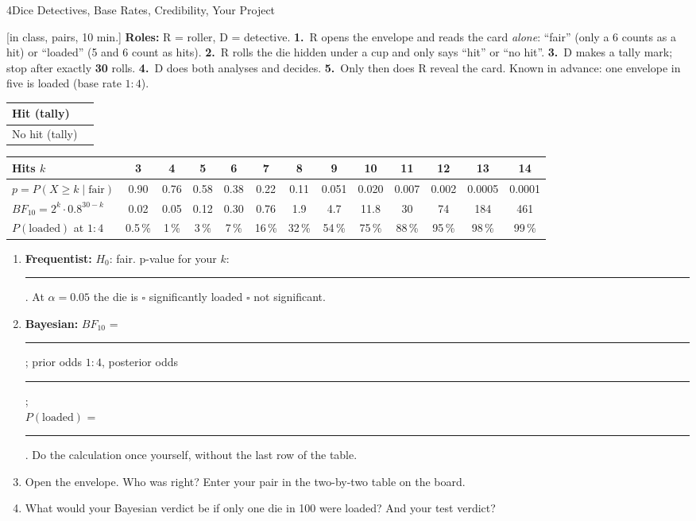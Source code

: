 \begin{uebungsblattb}{4}{Dice Detectives, Base Rates, Credibility, Your Project}

[in class, pairs, 10 min.]
\textbf{Roles:} R = roller, D = detective. \textbf{1.}~R opens the
envelope and reads the card \emph{alone}: \enquote{fair} (only a 6 counts
as a hit) or \enquote{loaded} (5 and 6 count as hits). \textbf{2.}~R rolls
the die hidden under a cup and only says \enquote{hit} or \enquote{no
hit}. \textbf{3.}~D makes a tally mark; stop after exactly \textbf{30}
rolls. \textbf{4.}~D does both analyses and decides. \textbf{5.}~Only then
does R reveal the card. Known in advance: one envelope in five is loaded
(base rate $1:4$).

\begin{center}
\renewcommand{\arraystretch}{1.6}
\begin{tabular}{|p{}|p{}|}
\hline
Hit (tally) & \\ \hline
No hit (tally) & \\ \hline
\end{tabular}
\end{center}

\begin{center}
\footnotesize
\setlength{\tabcolsep}{3.5pt}
\begin{tabular}{@{}l*{12}{c}@{}}
\toprule
Hits $k$ & 3 & 4 & 5 & 6 & 7 & 8 & 9 & 10 & 11 & 12 & 13 & 14 \\
\midrule
$p=P(X\geq k\mid\text{fair})$ & 0.90 & 0.76 & 0.58 & 0.38 & 0.22 & 0.11 & 0.051 & 0.020 & 0.007 & 0.002 & 0.0005 & 0.0001 \\
$\mathit{BF}_{10}=2^k\cdot0.8^{30-k}$ & 0.02 & 0.05 & 0.12 & 0.30 & 0.76 & 1.9 & 4.7 & 11.8 & 30 & 74 & 184 & 461 \\
$P(\text{loaded})$ at $1:4$ & 0.5\,\% & 1\,\% & 3\,\% & 7\,\% & 16\,\% & 32\,\% & 54\,\% & 75\,\% & 88\,\% & 95\,\% & 98\,\% & 99\,\% \\
\bottomrule
\end{tabular}
\end{center}

\begin{enumerate}
  \item \textbf{Frequentist:} $H_0$: fair. p-value for your $k$:
    \rule{20mm}{0.3pt}. At $\alpha=0.05$ the die is
    $\square$ significantly loaded \quad $\square$ not significant.
  \item \textbf{Bayesian:} $\mathit{BF}_{10}$ = \rule{18mm}{0.3pt};
    prior odds $1:4$, posterior odds \rule{18mm}{0.3pt};\\
    $P(\text{loaded})$ = \rule{18mm}{0.3pt}. Do the calculation once
    yourself, without the last row of the table.
  \item Open the envelope. Who was right? Enter your pair in the
    two-by-two table on the board.
  \item What would your Bayesian verdict be if only one die in 100 were
    loaded? And your test verdict?
\end{enumerate}



\end{uebungsblattb}
